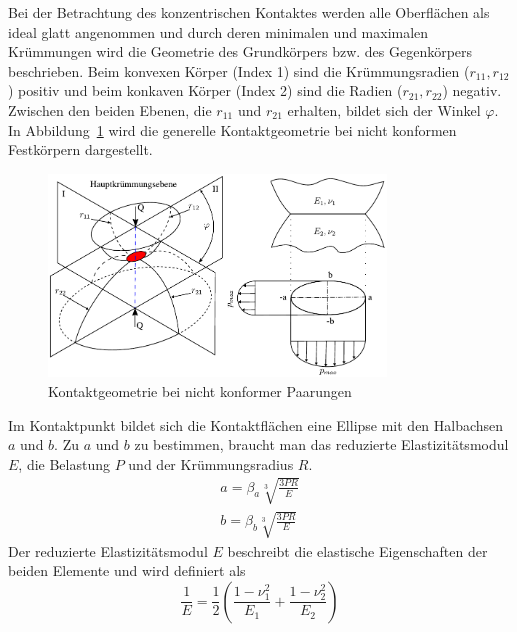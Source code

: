 Bei der Betrachtung des konzentrischen Kontaktes werden alle Oberflächen als ideal glatt angenommen und durch deren minimalen und maximalen Krümmungen wird die Geometrie des Grundkörpers bzw. des Gegenkörpers beschrieben.
Beim konvexen Körper (Index 1) sind die Krümmungsradien ($r_{11}, r_{12}$) positiv und beim konkaven Körper (Index 2) sind die Radien ($r_{21}, r_{22}$) negativ.
Zwischen den beiden Ebenen, die $r_{11}$ und $r_{21}$ erhalten, bildet sich der Winkel $\varphi$.
In Abbildung~\ref{fig:kontaktgeometrie_nichtkonforme_kontakte} wird die generelle Kontaktgeometrie bei nicht konformen Festkörpern dargestellt.
\begin{figure}[htb]
    \centering
    \includegraphics[width=0.8\textwidth]{./images/Hertzsche_Pressung.pdf}
    \caption{Kontaktgeometrie bei nicht konformer Paarungen\cite{psm}}
    \label{fig:kontaktgeometrie_nichtkonforme_kontakte}
\end{figure}
%
Im Kontaktpunkt bildet sich die Kontaktflächen eine Ellipse mit den Halbachsen $a$ und $b$.
Zu $a$ und $b$ zu bestimmen, braucht man das reduzierte Elastizitätsmodul $E$, die Belastung $P$ und der Krümmungsradius $R$.
\begin{align}
    a = \beta_a  \sqrt[3]{\frac{3  P  R}{E}} \label{eq:laenge_a} \\
    b = \beta_b  \sqrt[3]{\frac{3  P  R}{E}} \label{eq:laenge_b}
\end{align}
%
Der reduzierte Elastizitätsmodul $E$ beschreibt die elastische Eigenschaften der beiden Elemente und wird definiert als
\begin{equation}
    \label{eq:reduzierter_elastizitaetsmodul}
    \frac{1}{E} = \frac{1}{2}  \left( \frac{1 - \nu_1^2}{E_1} + \frac{1 - \nu_2^2}{E_2} \right)
\end{equation}
